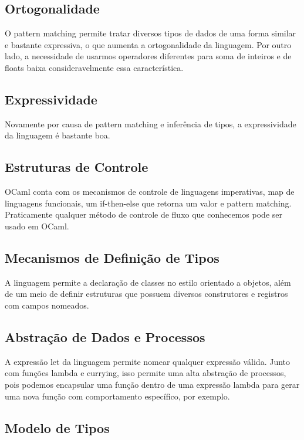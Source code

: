 \documentclass[a4paper,10pt]{article}
\begin{document}
	\subsection{Ortogonalidade}
		O pattern matching permite tratar diversos tipos de dados de uma forma similar e bastante expressiva, o que aumenta a ortogonalidade da linguagem. Por outro lado, a necessidade de usarmos operadores diferentes para soma de inteiros e de floats baixa consideravelmente essa característica.
		
	\subsection{Expressividade}
		Novamente por causa de pattern matching e inferência de tipos, a expressividade da linguagem é bastante boa.
		
	\subsection{Estruturas de Controle}
		OCaml conta com os mecanismos de controle de linguagens imperativas, map de linguagens funcionais, um if-then-else que retorna um valor e pattern matching. Praticamente qualquer método de controle de fluxo que conhecemos pode ser usado em OCaml.
		
	\subsection{Mecanismos de Definição de Tipos}
		A linguagem permite a declaração de classes no estilo orientado a objetos, além de um meio de definir estruturas que possuem diversos construtores e registros com campos nomeados. 
		
	\subsection{Abstração de Dados e Processos}
		A expressão let da linguagem permite nomear qualquer expressão válida. Junto com funções lambda e currying, isso permite uma alta abstração de processos, pois podemos encapsular uma função dentro de uma expressão lambda para gerar uma nova função com comportamento específico, por exemplo.
		
	\subsection{Modelo de Tipos}
		
		
		
\end{document}

